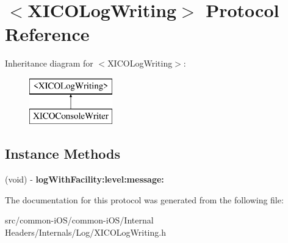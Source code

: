 \hypertarget{protocol_x_i_c_o_log_writing-p}{}\section{$<$X\+I\+C\+O\+Log\+Writing$>$ Protocol Reference}
\label{protocol_x_i_c_o_log_writing-p}
Inheritance diagram for $<$X\+I\+C\+O\+Log\+Writing$>$\+:\begin{figure}[H]
\begin{center}
\leavevmode
\includegraphics[height=2.000000cm]{protocol_x_i_c_o_log_writing-p}
\end{center}
\end{figure}
\subsection*{Instance Methods}
\begin{DoxyCompactItemize}
\item 
\hypertarget{protocol_x_i_c_o_log_writing-p_a3b86609dfa74f6f79b39f56c72740046}{}\label{protocol_x_i_c_o_log_writing-p_a3b86609dfa74f6f79b39f56c72740046} 
(void) -\/ {\bfseries log\+With\+Facility\+:level\+:message\+:}
\end{DoxyCompactItemize}


The documentation for this protocol was generated from the following file\+:\begin{DoxyCompactItemize}
\item 
src/common-\/i\+O\+S/common-\/i\+O\+S/\+Internal Headers/\+Internals/\+Log/X\+I\+C\+O\+Log\+Writing.\+h\end{DoxyCompactItemize}
